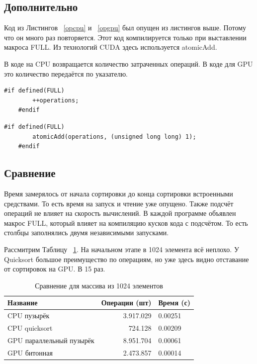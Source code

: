 \documentclass[a4paper,article]{article}
\begin{document}
    \subsection{Дополнительно}

    Код из Листингов ~\ref{opcpu} и ~\ref{opgpu} был опущен из листингов выше. Потому что он много раз повторяется. Этот код компилируется только при выставлении макроса FULL. Из технологий CUDA здесь используется atomicAdd.

    В коде на CPU возвращается количество затраченных операций. В коде для GPU это количество передаётся по указателю.

    \begin{lstlisting}[label=opcpu,caption=Подсчёт количества операций в сортировках на CPU]
    #if defined(FULL)
        ++operations;
    #endif
    \end{lstlisting}

    \begin{lstlisting}[label=opgpu,caption=Подсчёт количества операций в сортировках на GPU]
    #if defined(FULL)
        atomicAdd(operations, (unsigned long long) 1);
    #endif
    \end{lstlisting}

    \subsection{Сравнение}

    Время замерялось от начала сортировки до конца сортировки встроенными средствами. То есть время на запуск и чтение уже опущено. Также подсчёт операций не влияет на скорость вычислений. В каждой программе объявлен макрос FULL, который влияет на компиляцию кусков кода с подсчётом. То есть столбцы заполнялись двумя независимыми запусками.

    Рассмитрим Таблицу ~\ref{table:comparsion1024}. На начальном этапе в 1024 элемента всё неплохо. У Quicksort большое преимущество по операциям, но уже здесь видно отставание от сортировок на GPU. В 15 раз.

    \begin{table}[h!]
        \centering
        \begin{tabular}{| l | r | l |}
            \hline
            {Название} & Операции (шт) & Время (с) \\
            \hline
            CPU пузырёк & 3.917.029 & 0.00251 \\
            \hline
            CPU quicksort & 724.128 & 0.00209 \\
            \hline
            GPU параллельный пузырёк & 8.951.704 & 0.00061 \\
            \hline
            GPU битонная & 2.473.857 & 0.00014 \\
            \hline
        \end{tabular}
        \caption{Сравнение для массива из 1024 элементов}
        \label{table:comparsion1024}
    \end{table}
\end{document}
